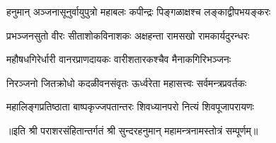 

\twolineshloka
{हनुमान् अञ्जनासूनुर्वायुपुत्रो महाबलः}
{कपीन्द्रः पिङ्गळाक्षश्च लङ्काद्वीपभयङ्करः}

\twolineshloka
{प्रभञ्जनसुतो वीरः सीताशोकविनाशकः}
{अक्षहन्ता रामसखो रामकार्यदुरन्धरः}

\twolineshloka
{महौषधगिरेर्धारी वानरप्राणदायकः}
{वारीशतारकश्चैव मैनाकगिरिभञ्जनः}

\twolineshloka
{निरञ्जनो जितक्रोधो कदळीवनसंवृतः}
{ऊर्ध्वरेता महासत्त्वः सर्वमन्त्रप्रवर्तकः}

\twolineshloka
{महालिङ्गप्रतिष्ठाता बाष्पकृज्जपतान्तरः}
{शिवध्यानपरो नित्यं शिवपूजापरायणः}


॥इति श्री पराशरसंहितान्तर्गतं श्री सुन्दरहनुमान् महामन्त्रनामस्तोत्रं सम्पूर्णम्॥
